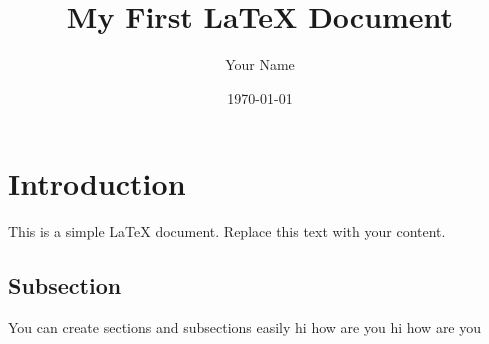 \documentclass{article}
\begin{document}
\title{My First LaTeX Document}
\author{Your Name}
\date{\today}
\maketitle

\section{Introduction}
This is a simple LaTeX document. Replace this text with your content.

\subsection{Subsection}
You can create sections and subsections easily hi how are you
\newpage
hi how are you
\end{document}
